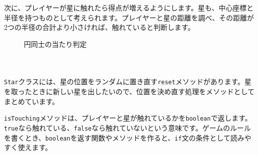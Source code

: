 次に、プレイヤーが星に触れたら得点が増えるようにします。星も、中心座標と半径を持つものとして考えられます。プレイヤーと星の距離を調べ、その距離が2つの半径の合計より小さければ、触れていると判断します。

\begin{figure}[htbp]
    \centering
    \caption{円同士の当たり判定}
    \label{fig:chapter15-circle-hit-test}
\end{figure}

\begin{listing}[htbp]
\inputminted[firstline=1,lastline=44]{ts}{typescript-p5/listings/chapter15/collect-star.ts}
\caption{星を取るサンプルで使う\texttt{Player}（\texttt{chapter15/collect-star.ts}）}
\label{lst:chapter15-collect-star-player}
\end{listing}

\begin{listing}[htbp]
\inputminted[firstline=46,lastline=82]{ts}{typescript-p5/listings/chapter15/collect-star.ts}
\caption{取る対象になる\texttt{Star}（\texttt{chapter15/collect-star.ts}）}
\label{lst:chapter15-collect-star-class}
\end{listing}

\begin{listing}[htbp]
\inputminted[firstline=84,lastline=120]{ts}{typescript-p5/listings/chapter15/collect-star.ts}
\caption{星を取ったら得点を増やすスケッチ（\texttt{chapter15/collect-star.ts}）}
\label{lst:chapter15-collect-star-sketch}
\end{listing}

\texttt{Star}クラスには、星の位置をランダムに置き直す\texttt{reset}メソッドがあります。星を取ったときに新しい星を出したいので、位置を決め直す処理をメソッドとしてまとめています。

\texttt{isTouching}メソッドは、プレイヤーと星が触れているかを\texttt{boolean}で返します。\texttt{true}なら触れている、\texttt{false}なら触れていないという意味です。ゲームのルールを書くとき、\texttt{boolean}を返す関数やメソッドを作ると、\texttt{if}文の条件として読みやすく使えます。

